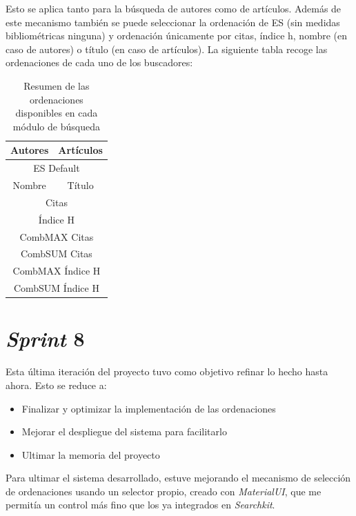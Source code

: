 Esto se aplica tanto para la búsqueda de autores como de artículos. Además de este mecanismo también se puede seleccionar la ordenación de \acrshort{ES} (sin medidas bibliométricas ninguna) y ordenación únicamente por citas, índice h, nombre (en caso de autores) o título (en caso de artículos). La siguiente tabla recoge las ordenaciones de cada uno de los buscadores:

\begin{table} [h!]
	\centering
	\begin{tabular}{| c | c |}
		\hline
		\textbf{Autores} & \textbf{Artículos}\\
		\hline\hline
		\multicolumn{2}{|c|}{\acrshort{ES} Default} \\ \hline
		Nombre & Título \\ \hline
		\multicolumn{2}{|c|}{Citas} \\ \hline 
		\multicolumn{2}{|c|}{Índice H} \\ \hline
		\multicolumn{2}{|c|}{CombMAX Citas} \\ \hline
		\multicolumn{2}{|c|}{CombSUM Citas} \\ \hline
		\multicolumn{2}{|c|}{CombMAX Índice H} \\ \hline
		\multicolumn{2}{|c|}{CombSUM Índice H } \\ \hline
		
	\end{tabular}
	\caption{Resumen de las ordenaciones disponibles en cada módulo de búsqueda}
\end{table}


\section{\textit{Sprint} 8}
Esta última iteración del proyecto tuvo como objetivo refinar lo hecho hasta ahora. Esto se reduce a:
\begin{itemize}
	\item Finalizar y optimizar la implementación de las ordenaciones 
	\item Mejorar el despliegue del sistema para facilitarlo
	\item Ultimar la memoria del proyecto
\end{itemize}

Para ultimar el sistema desarrollado, estuve mejorando el mecanismo de selección de ordenaciones usando un selector propio, creado con \textit{MaterialUI}, que me permitía un control más fino que los ya integrados en \textit{Searchkit}. 

